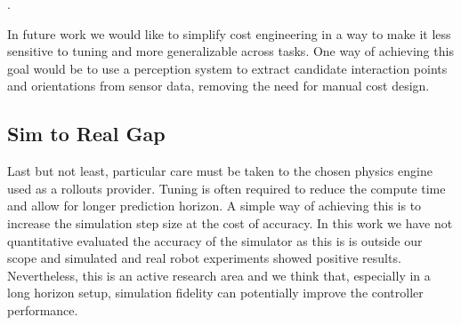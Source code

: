 .

In future work we would like to simplify cost engineering in a way to make it less sensitive to tuning and more generalizable across tasks. One way of achieving this goal would be to use a perception system to extract candidate interaction points and orientations from sensor data, removing the need for manual cost design. 

\subsection{Sim to Real Gap}
Last but not least, particular care must be taken to the chosen physics engine used as a rollouts provider. Tuning is often required to reduce the compute time and allow for longer prediction horizon. A simple way of achieving this is to increase the simulation step size at the cost of accuracy. In this work we have not quantitative evaluated the accuracy of the simulator as this is is outside our scope and simulated and real robot experiments showed positive results. Nevertheless, this is an active research area and we think that, especially in a long horizon setup, simulation fidelity can potentially improve the controller performance. 
